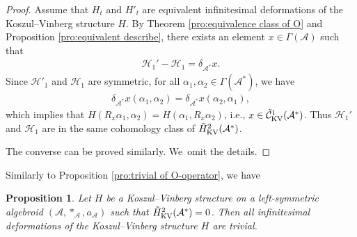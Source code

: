 \documentclass[pdftex]{sigma}%
\numberwithin{equation}{section}
\newtheorem{pro}[thm]{Proposition}
\newcommand{\huaA}{\mathcal{A}}
\newcommand{\huaC}{\mathcal{C}}
\newcommand{\huaH}{\mathcal{H}}
\begin{document}
\begin{proof}
Assume that $H_t$ and $H'_t$ are equivalent infinitesimal deformations of the Koszul--Vinberg structure $H$. By Theorem \ref{pro:equivalence class of O} and Proposition \ref{pro:equivalent describe}, there exists an element $x\in\Gamma(\huaA)$ such that\vspace{-.5ex}
\begin{gather*}
\huaH_1'- \huaH_1=\delta_{\huaA^* }x.
\end{gather*}
Since $\huaH'_1$ and $\huaH_1$ are symmetric, for all $\alpha_1,\alpha_2\in \Gamma(\huaA^*)$, we have\vspace{-.5ex}
\begin{gather*}
\delta_{\huaA^* }x(\alpha_1,\alpha_2)=\delta_{\huaA^* }x(\alpha_2,\alpha_1),
\end{gather*}
which implies that $H(R_x \alpha_1,\alpha_2)=H(\alpha_1,R_x\alpha_2)$, i.e., $x\in 	\tilde{\huaC}_{\rm KV}^1(\huaA^*)$. Thus $\huaH_1'$ and $\huaH_1$ are in the same cohomology class of $\tilde{H}_{\rm KV}^2(\huaA^*)$.

The converse can be proved similarly. We~omit the details.\vspace{-.5ex}
\end{proof}

Similarly to Proposition \ref{pro:trivial of O-operator}, we have\vspace{-.5ex}
{\sloppy\begin{pro}
Let $H$ be a Koszul--Vinberg structure on a left-symmetric algebroid $(\huaA,\ast_\huaA,a_\huaA)$ such that $\tilde{H}_{\rm KV}^2(\huaA^*)=0$. Then all infinitesimal deformations of the Koszul--Vinberg structure $H$ are trivial.
\end{pro}}
\end{document}
